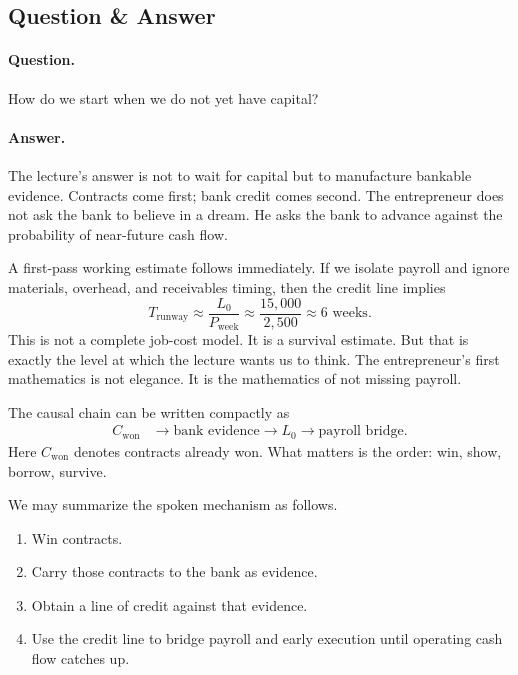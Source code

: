 \subsection{Question \& Answer}

\paragraph{Question.} How do we start when we do not yet have capital?

\paragraph{Answer.} The lecture's answer is not to wait for capital but to manufacture bankable evidence. Contracts come first; bank credit comes second. The entrepreneur does not ask the bank to believe in a dream. He asks the bank to advance against the probability of near-future cash flow.

A first-pass working estimate follows immediately. If we isolate payroll and ignore materials, overhead, and receivables timing, then the credit line implies
\begin{equation}
T_{\text{runway}} \approx \frac{L_0}{P_{\text{week}}}
\approx \frac{15{,}000}{2{,}500}
\approx 6 \text{ weeks}.
\end{equation}
This is not a complete job-cost model. It is a survival estimate. But that is exactly the level at which the lecture wants us to think. The entrepreneur's first mathematics is not elegance. It is the mathematics of not missing payroll.

The causal chain can be written compactly as
\begin{align}
C_{\text{won}}
&\longrightarrow \text{bank evidence}
\longrightarrow L_0
\longrightarrow \text{payroll bridge}.
\end{align}
Here \(C_{\text{won}}\) denotes contracts already won. What matters is the order: win, show, borrow, survive.

We may summarize the spoken mechanism as follows.
\begin{enumerate}
\item Win contracts.
\item Carry those contracts to the bank as evidence.
\item Obtain a line of credit against that evidence.
\item Use the credit line to bridge payroll and early execution until operating cash flow catches up.
\end{enumerate}

